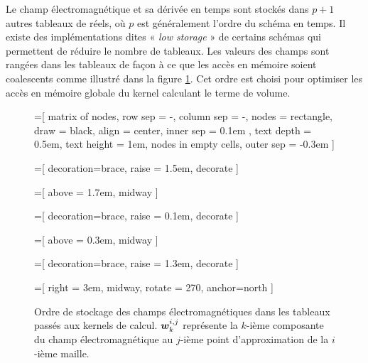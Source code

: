 Le champ électromagnétique et sa dérivée en temps sont stockés
dans $p + 1$ autres tableaux de réels, où $p$ est généralement l'ordre du schéma en temps.
Il existe des implémentations dites « \textit{low storage} » de certains schémas
qui permettent de réduire le nombre de tableaux.
Les valeurs des champs sont rangées dans les tableaux de façon à ce que les accès
en mémoire soient coalescents comme illustré dans la figure
\ref{img:stockage_coalescent}. Cet ordre est choisi pour optimiser les accès
en mémoire globale du kernel calculant le terme de volume.
 

\begin{figure}[!h]
	\begin{center}
		\caption{
			\label{img:stockage_coalescent}
			Ordre de stockage des champs électromagnétiques dans les tableaux
			passés aux kernels de calcul.
			$\bm{w}_k^{i,j}$ représente la $k$-ième composante du champ
			électromagnétique au $j$-ième point d'approximation de la $i$-ième maille.
		}
		=[
			matrix of nodes,
			row sep = -\pgflinewidth,
			column sep = -\pgflinewidth,
			nodes = {
				rectangle,
				draw = black,
				align = center,
				inner sep = 0.1em
			},
			text depth = 0.5em,
			text height = 1em,
			nodes in empty cells,
			outer sep = -0.3em
		]
		
		=[
			decoration={brace, raise = 1.5em}, decorate
		]
		
		=[
			above = 1.7em, midway
		]
		
		=[
			decoration={brace, raise = 0.1em}, decorate
		]
		
		=[
			above = 0.3em, midway
		]
		
		=[
			decoration={brace, raise = 1.3em}, decorate
		]
		
		=[
			right = 3em, midway, rotate = 270, anchor=north
		]
		
\end{center}
\end{figure}
